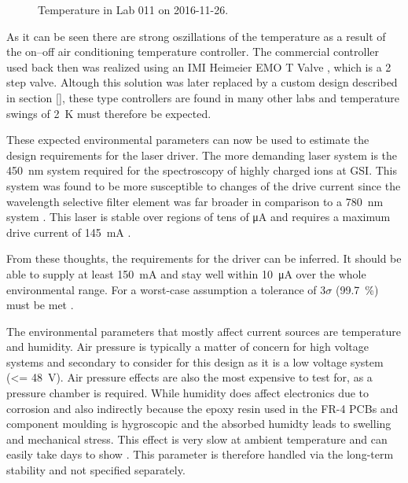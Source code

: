 \begin{figure}[ht]
    \centering
    
    \caption{Temperature in Lab 011 on 2016-11-26.}
    \label{fig:lab_temperature_start_of_project}
\end{figure}

As it can be seen there are strong oszillations of the temperature as a result of the on–off air conditioning temperature controller. The commercial controller used back then was realized using an IMI Heimeier EMO T Valve \cite{datasheet_heimeier_emo_t}, which is a 2 step valve. Altough this solution was later replaced by a custom design described in section \ref{}, these type controllers are found in many other labs and temperature swings of \qty{2}{\kelvin} must therefore be expected.

These expected environmental parameters can now be used to estimate the design requirements for the laser driver. The more demanding laser system is the \qty{450}{\nm} system \cite{thesis_baus} required for the spectroscopy of highly charged ions \cite{thesis_alex} at GSI. This system was found to be more susceptible to changes of the drive current since the wavelength selective filter element was far broader in comparison to a \qty{780}{\nm} system \cite{two_filter_paper}. This laser is stable over regions of tens of \unit{\uA} and requires a maximum drive current of \qty{145}{\mA} \cite{datasheet_osram_pl450b}.

From these thoughts, the requirements for the driver can be inferred. It should be able to supply at least \qty{150}{\mA} and stay well within \qty{10}{\uA} over the whole environmental range. For a worst-case assumption a tolerance of $3\sigma$ (\qty{99.7}{\percent}) must be met \cite{worst_case_design}.

The environmental parameters that mostly affect current sources are temperature and humidity. Air pressure is typically a matter of concern for high voltage systems \cite{IPC-2221B} and secondary to consider for this design as it is a low voltage system (\qty{<= 48}{\V}). Air pressure effects are also the most expensive to test for, as a pressure chamber is required. While humidity does affect electronics due to corrosion and also indirectly because the epoxy resin used in the FR-4 PCBs and component moulding is hygroscopic and the absorbed humidty leads to swelling and mechanical stress. This effect is very slow at ambient temperature and can easily take days to show \cite{epoxy_humidity}. This parameter is therefore handled via the long-term stability and not specified separately.

